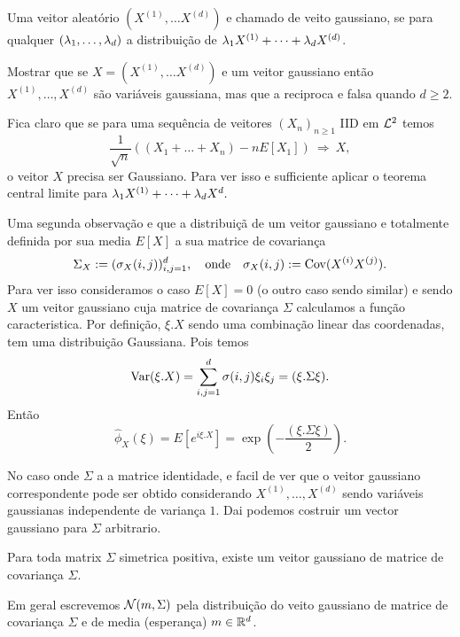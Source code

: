 \begin{definition}
 Uma veitor aleatório $(X^{(1)},\dots X^{(d)})$ e chamado de veito gaussiano, se para qualquer $(\lambda_1,\dots,\lambda_d)$
 a distribuição de 
 $\lambda_1 X^{(1)} +\dots+\lambda_d X^{(d)}$.
\end{definition}

\begin{exercise}
 Mostrar que se $X=(X^{(1)},\dots X^{(d)})$ e um veitor gaussiano então $X^{(1)},\dots,X^{(d)}$ são variáveis gaussiana, mas que a reciproca e falsa quando $d\ge 2$. 
\end{exercise}


Fica claro que se para uma sequência de veitores $(X_n)_{n\ge 1}$ IID em ${\mathcal L}^2$ temos
$$ \frac{1}{\sqrt{n}}( (X_1+\dots+X_n) -nE[X_1])\ \Longrightarrow \ X, $$
o veitor $X$ precisa ser Gaussiano. Para ver isso e sufficiente aplicar o teorema central limite para  
$\lambda_1 X^{(1)} +\dots+\lambda_d X^d.$

\medskip

Uma segunda observação e que a distribuiçã de um veitor gaussiano e totalmente definida por sua media 
$E[X]$
a sua matrice de covariança
\begin{equation}
 \Sigma_X:=(\sigma_X(i,j))_{i,j=1}^d, \quad  \text{onde} \quad \sigma_X(i,j):= \operatorname{Cov}(X^{(i)}X^{(j)}).
\end{equation}
Para ver isso consideramos o caso $E[X]=0$ (o outro caso sendo similar) 
e sendo $X$ um veitor gaussiano cuja matrice de covariança $\Sigma$ calculamos a função caracteristica.
Por definição, $\xi.X$ sendo uma combinação linear das coordenadas, tem uma distribuição Gaussiana.
Pois temos
\begin{equation}
\operatorname{Var}(\xi.X)=\sum_{i,j=1}^d \sigma(i,j) \xi_i \xi_j= (\xi. \Sigma \xi).
\end{equation}
Então
\begin{equation}
 \hat \phi_X(\xi)= E[e^{i\xi.X}]=\exp\left(-\frac{(\xi. \Sigma \xi)}{2}\right).
\end{equation}

No caso onde $\Sigma$ a a matrice identidade, e facil de ver que o veitor gaussiano correspondente pode ser obtido 
considerando $X^{(1)},\dots,X^{(d)}$ sendo variáveis gaussianas independente de variança $1$. Dai podemos costruir um vector gaussiano para $\Sigma$ arbitrario.


\begin{proposition}
Para toda matrix $\Sigma$ simetrica positiva, existe um veitor gaussiano de matrice de covariança $\Sigma$.  
\end{proposition}
Em geral escrevemos ${\mathcal N}(m,\Sigma)$ pela distribuição do veito gaussiano de matrice de covariança $\Sigma$ e de media (esperança) $m\in {\ensuremath{\mathbb R}}^d$.


